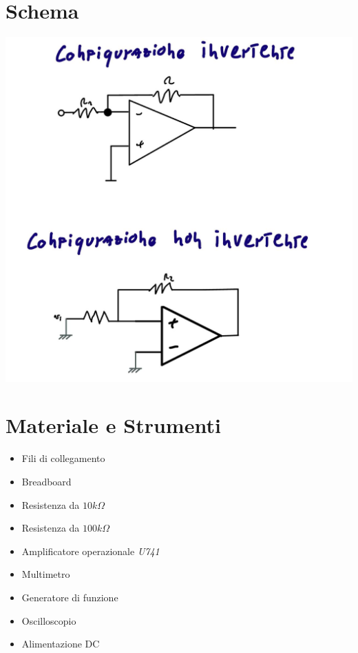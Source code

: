 \documentclass[12pt]{article}
\begin{document}
\section{Schema}
\begin{flushleft}
    \includegraphics[scale=0.28]{Schema.jpg}
\end{flushleft}

\section{Materiale e Strumenti}
\label{Materiale e Strumenti}
\begin{multicols}{2}
    \begin{itemize}
    \item Fili di collegamento
    \item Breadboard
    \item Resistenza da $10k\Omega$
    \item Resistenza da $100k\Omega$
    \item Amplificatore operazionale \textit{U741}
    \end{itemize}
    \vfill\null
    \columnbreak
    \begin{itemize}
    \item Multimetro
    \item Generatore di funzione
    \item Oscilloscopio
    \item Alimentazione DC 
    \end{itemize}
    \vfill\null
    \end{multicols}
\vspace{15pt}
\end{document}
